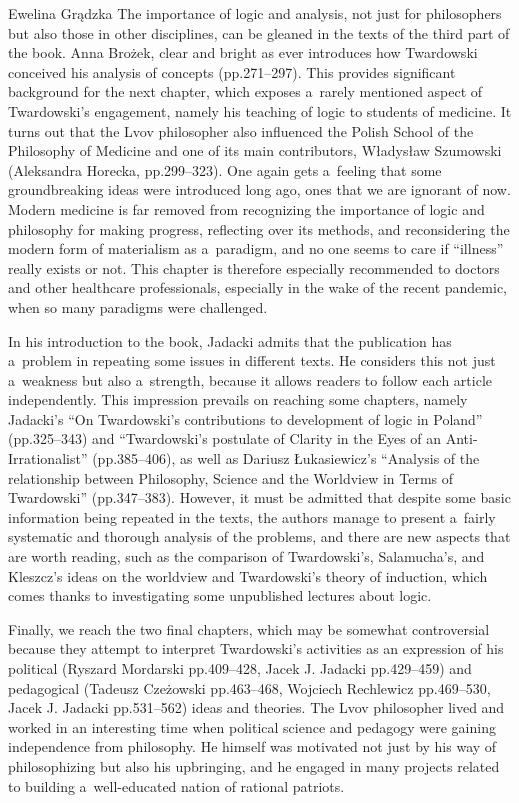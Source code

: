\begin{newrevengenv}{Ewelina Grądzka}
The importance of logic and analysis, not just for philosophers but also those in other disciplines, can be gleaned in the texts of the third part of the book. Anna Brożek, clear and bright as ever
\parencites{brozek_analiza_2020}[cf.][]{gradzka_putting_2021}
introduces how Twardowski conceived his analysis of concepts (pp.271–297). This provides significant background for the next chapter, which exposes a~rarely mentioned aspect of Twardowski's engagement, namely his teaching of logic to students of medicine. It turns out that the Lvov philosopher also influenced the Polish School of the Philosophy of Medicine and one of its main contributors, Władysław Szumowski (Aleksandra Horecka, pp.299–323). One again gets a~feeling that some groundbreaking ideas were introduced long ago, ones that we are ignorant of now. Modern medicine is far removed from recognizing the importance of logic and philosophy for making progress, reflecting over its methods, and reconsidering the modern form of materialism as a~paradigm, and no one seems to care if ``illness'' really exists or not. This chapter is therefore especially recommended to doctors and other healthcare professionals, especially in the wake of the recent pandemic, when so many paradigms were challenged.

In his introduction to the book, Jadacki admits that the publication has a~problem in repeating some issues in different texts. He considers this not just a~weakness but also a~strength, because it allows readers to follow each article independently. This impression prevails on reaching some chapters, namely Jadacki's ``On Twardowski's contributions to development of logic in Poland'' (pp.325–343) and ``Twardowski's postulate of Clarity in the Eyes of an Anti-Irrationalist'' (pp.385–406), as well as Dariusz Łukasiewicz's ``Analysis of the relationship between Philosophy, Science and the Worldview in Terms of Twardowski'' (pp.347–383). However, it must be admitted that despite some basic information being repeated in the texts, the authors manage to present a~fairly systematic and thorough analysis of the problems, and there are new aspects that are worth reading, such as the comparison of Twardowski's, Salamucha's, and Kleszcz's ideas on the worldview and Twardowski's theory of induction, which comes thanks to investigating some unpublished lectures about logic.

Finally, we reach the two final chapters, which may be somewhat controversial because they attempt to interpret Twardowski's activities as an expression of his political (Ryszard Mordarski pp.409–428, Jacek J. Jadacki pp.429–459) and pedagogical (Tadeusz Czeżowski pp.463–468, Wojciech Rechlewicz pp.469–530, Jacek J. Jadacki pp.531–562) ideas and theories. The Lvov philosopher lived and worked in an interesting time when political science and pedagogy were gaining independence from philosophy. He himself was motivated not just by his way of philosophizing but also his upbringing, and he engaged in many projects related to building a~well-educated nation of rational patriots.


\end{newrevengenv}
